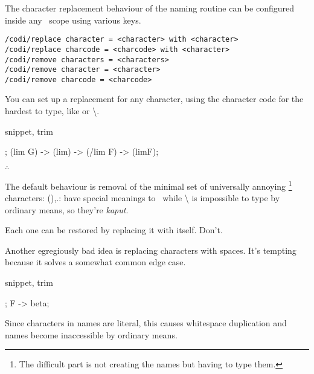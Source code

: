 The character replacement behaviour of the naming routine can be configured
inside any \CoDi\ scope using various keys.

\begin{lstlisting}
/codi/replace character = <character> with <character>
/codi/replace charcode = <charcode> with <character>
/codi/remove characters = <characters>
/codi/remove character = <character>
/codi/remove charcode = <charcode>
\end{lstlisting}

You can set up a replacement for any character, using the character code for
the hardest to type, like {\ttfamily \textvisiblespace} or {\ttfamily \textbackslash}.

\begin{tcblisting}{snippet, trim}
\begin{codi}[tetragonal]
; %
\mor (lim G) -> (lim) -> (/lim F) -> (limF);
\end{codi}
\end{tcblisting}

\hfill$\therefore$\hfill\null

The default behaviour is removal of the minimal set of universally annoying%
\footnote{The difficult part is not creating the names but having to type them.}
characters: {\ttfamily (),.:}  have special meanings to \TikZ\ while
{\ttfamily \textbackslash} is impossible to type by ordinary means, so they're \emph{kaput}.

Each one can be restored by replacing it with itself. Don't.

Another egregiously bad idea is replacing characters with spaces.
It's tempting because it solves a somewhat common edge case.

\begin{tcblisting}{snippet, trim}
\begin{codi}[tetragonal]
;
\mor F -> beta;
\end{codi}
\end{tcblisting}

Since characters in names are literal, this causes whitespace
duplication and names become inaccessible by ordinary means.

